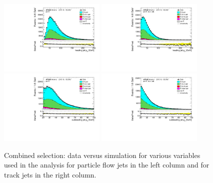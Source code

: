 \documentclass[letterpaper,12pt]{article}
\begin{document}
\begin{figure}[!h]
		\centering
		\includegraphics[width=0.45\textwidth]{figs_support/plots_def/DataMC_h_J0_pt_all.pdf}
		\includegraphics[width=0.45\textwidth]{figs_support/plots_def/DataMC_h_tjet_J0_pt_all.pdf}\\
		\includegraphics[width=0.45\textwidth]{figs_support/plots_def/DataMC_h_J1_pt_all.pdf}
		\includegraphics[width=0.45\textwidth]{figs_support/plots_def/DataMC_h_tjet_J1_pt_all.pdf}\\
		\caption{Combined selection: data versus simulation for various variables used in the analysis for 
		particle flow jets in the left column and for track jets in the right column.}
		\label{fig:kinematic_distributions_combined}
\end{figure}
		
\end{document}
